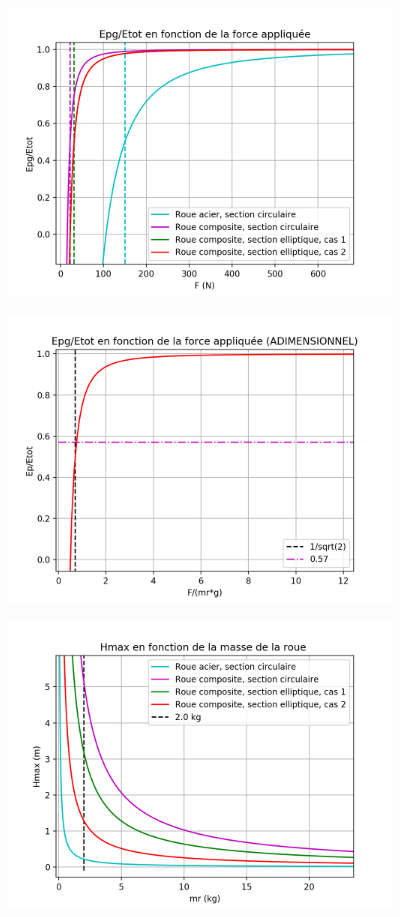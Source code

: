 \begin{figure}[htb]
\centering
\includegraphics[width=4in]{images_2ddl/epf.png}
\caption{}
\label{fig:epf}
\end{figure}

\begin{figure}[htb]
\centering
\includegraphics[width=4in]{images_2ddl/epfa.png}
\caption{}
\label{fig:epfa}
\end{figure}

\begin{figure}[htb]
\centering
\includegraphics[width=4in]{images_2ddl/hmaxm.png}
\caption{}
\label{fig:hmaxm}
\end{figure}

